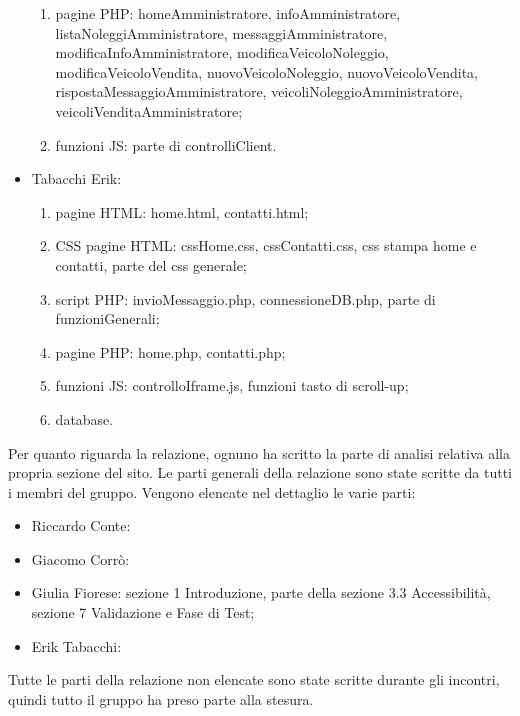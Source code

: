 \begin{itemize}
\begin{enumerate}
            \item pagine PHP: homeAmministratore, infoAmministratore, listaNoleggiAmministratore, messaggiAmministratore, modificaInfoAmministratore, modificaVeicoloNoleggio, modificaVeicoloVendita, nuovoVeicoloNoleggio, nuovoVeicoloVendita, rispostaMessaggioAmministratore, veicoliNoleggioAmministratore, veicoliVenditaAmministratore;
            \item funzioni JS: parte di controlliClient.
        \end{enumerate}
    \item Tabacchi Erik:
        \begin{enumerate}
            \item pagine HTML: home.html, contatti.html;
            \item CSS pagine HTML: cssHome.css, cssContatti.css, css stampa home e contatti, parte del css generale;
            \item script PHP: invioMessaggio.php, connessioneDB.php, parte di funzioniGenerali;
            \item pagine PHP: home.php, contatti.php;
            \item funzioni JS: controlloIframe.js, funzioni tasto di scroll-up;
            \item database.
        \end{enumerate}
\end{itemize}
Per quanto riguarda la relazione, ognuno ha scritto la parte di analisi relativa alla propria sezione del sito. Le parti generali della relazione sono state scritte da tutti i membri del gruppo.
Vengono elencate nel dettaglio le varie parti:
\begin{itemize}
    \item Riccardo Conte:
    \item Giacomo Corrò:
    \item Giulia Fiorese: sezione 1 Introduzione, parte della sezione 3.3 Accessibilità, sezione 7 Validazione e Fase di Test;
    \item Erik Tabacchi:
\end{itemize}
Tutte le parti della relazione non elencate sono state scritte durante gli incontri, quindi tutto il gruppo ha preso parte alla stesura.
\pagebreak
